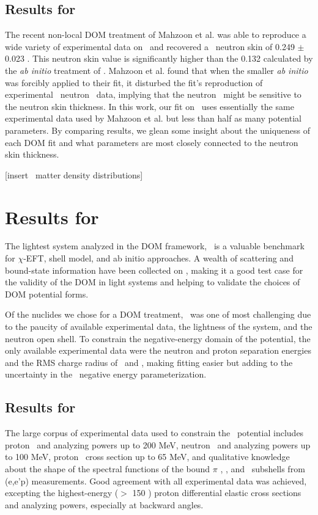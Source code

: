 \subsection{Results for \caEight}
The recent non-local DOM treatment of Mahzoon et al. \cite{Mahzoon2017} was able
to reproduce a wide variety of
experimental data on \caEight\ and recovered a \caEight\ neutron
skin of 0.249 $\pm$ 0.023 \femto\meter.
This neutron skin value is significantly higher than the 0.132 \femto\meter calculated by
the \textit{ab initio} treatment of \cite{Hagen2016}. Mahzoon et al. found that when the 
smaller \textit{ab initio} was forcibly applied to their fit, it disturbed the fit's
reproduction of experimental \caEight\ neutron \tot\ data, implying that the neutron \tot\ might
be sensitive to the neutron skin thickness. In this work, our fit on \caEight\ uses essentially the 
same experimental data used by Mahzoon et al. but less than half as many potential parameters.
By comparing results, we glean some insight about the uniqueness of each DOM fit and what parameters
are most closely connected to the neutron skin thickness.

[insert \caEight\ matter density distributions]

\section{Results for \oSixEight}
The lightest system analyzed in the DOM framework, \oSix\ is a valuable benchmark
for $\chi$-EFT, shell model, and ab initio approaches. A wealth of scattering and
bound-state information have been collected on \oSix, making it a good test case for the validity
of the DOM in light systems and helping to validate the choices of DOM potential forms.

Of the nuclides we chose for a DOM treatment, \oEight\ was one of most challenging due to the 
paucity of
available experimental data, the lightness of the system, and the neutron open shell.
To constrain the negative-energy domain
of the potential, the only available experimental data were the neutron and proton separation
energies and the RMS charge radius of \oEight\ and \neEight, making fitting easier but adding to the
uncertainty in the \oEight\ negative energy parameterization.

\subsection{Results for \oSix}
The large corpus of experimental data used to constrain the \oSix\
potential includes proton \el\ and analyzing powers up to 200 MeV, neutron \el\ and analyzing powers
up to 100 MeV, proton \rxn\ cross section up to 65 MeV, and qualitative knowledge about the shape of
the spectral functions of the bound $\pi$ \sOne, \pThree, and \pOne\ subshells from (e,e'p)
measurements. Good agreement with all 
experimental data was achieved, excepting the highest-energy ($>$ 150 \mega\electronvolt)
proton differential elastic cross sections and analyzing powers, especially at backward angles.

